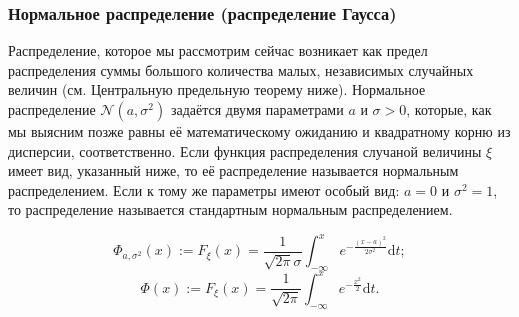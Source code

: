\documentclass[12pt]{article}
\numberwithin{theorem}{section}
\theoremstyle{definition}
\newcommand{\defin}[2]{\hypertarget{#2}{{\color{red} #1}}}
\newcommand{\diff}{\mathrm{d}}
\begin{document}
	\subsubsection{Нормальное распределение (распределение Гаусса)}
	
	Распределение, которое мы рассмотрим сейчас возникает 
	как предел распределения суммы большого количества малых, 
	независимых случайных величин (см. Центральную предельную теорему ниже).
	Нормальное распределение $ \mathcal{N}(a, \sigma^2) $ задаётся двумя параметрами $ a $ и $ \sigma > 0 $,
	которые, как мы выясним позже равны её математическому ожиданию и квадратному корню из дисперсии, соответственно.
	Если функция распределения случаной величины $ \xi $ имеет вид, указанный ниже,
	то её распределение называется \defin{нормальным распределением}{normal-distribution}.
	Если к тому же параметры имеют особый вид: $ a = 0 $ и $ \sigma^2 = 1 $,
	то распределение называется \defin{стандартным нормальным распределением}{standard-normal-distribution}.
	\begin{center}
		\begin{minipage}{0.45\textwidth}
			\[
			\Phi_{a, \sigma^2}(x) := F_\xi(x) = \frac{1}{\sqrt{2\pi}\sigma} \int_{-\infty}^x e^{-\tfrac{(x - a)^2}{2\sigma^2}} \diff t;
			\]
			{\color{orange}
			\[
			\Phi(x) := F_\xi(x) = \frac{1}{\sqrt{2\pi}} \int_{-\infty}^x e^{-\tfrac{x^2}{2}} \diff t.
			\]}
		\end{minipage}
		\begin{minipage}{0.5\textwidth}
		\end{minipage}
	\end{center}
	
\end{document}
